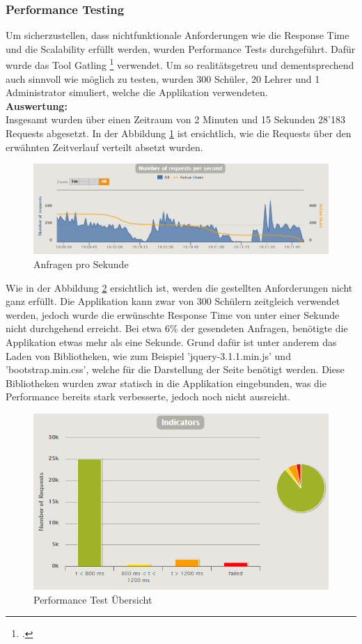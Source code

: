 \subsubsection{Performance Testing}
Um sicherzustellen, dass nichtfunktionale Anforderungen wie die Response Time und die Scalability erfüllt werden, wurden Performance Tests durchgeführt. Dafür wurde das Tool Gatling \footcite{performance_tests} verwendet. Um so realitätsgetreu und dementsprechend auch sinnvoll wie möglich zu testen, wurden 300 Schüler, 20 Lehrer und 1 Administrator simuliert, welche die Applikation verwendeten. \\

\textbf{Auswertung:} \\
Insgesamt wurden über einen Zeitraum von 2 Minuten und 15 Sekunden 28'183 Requests abgesetzt. In der Abbildung \ref{request_per_second} ist ersichtlich, wie die Requests über den erwähnten Zeitverlauf verteilt absetzt wurden.

	\begin{figure}[H]
		\includegraphics[width=\textwidth, height=\textheight, keepaspectratio]{images/performance_requests_per_second.png}
		\caption{Anfragen pro Sekunde}
			\label{request_per_second}
	\end{figure}

Wie in der Abbildung \ref{performance_tests} ersichtlich ist, werden die gestellten Anforderungen nicht ganz erfüllt. Die Applikation kann zwar von 300 Schülern zeitgleich verwendet werden, jedoch wurde die erwünschte Response Time von unter einer Sekunde nicht durchgehend erreicht. Bei etwa 6\% der gesendeten Anfragen, benötigte die Applikation etwas mehr als eine Sekunde. Grund dafür ist unter anderem das Laden von Bibliotheken, wie zum Beispiel 'jquery-3.1.1.min.js' und 'bootstrap.min.css', welche für die Darstellung der Seite benötigt werden. Diese Bibliotheken wurden zwar statisch in die Applikation eingebunden, was die Performance bereits stark verbesserte, jedoch noch nicht ausreicht. 

	\begin{figure}[H]
		\includegraphics[width=\textwidth, height=\textheight, keepaspectratio]{images/performance_uebersicht.png}
		\caption{Performance Test Übersicht}
			\label{performance_tests}
	\end{figure}





